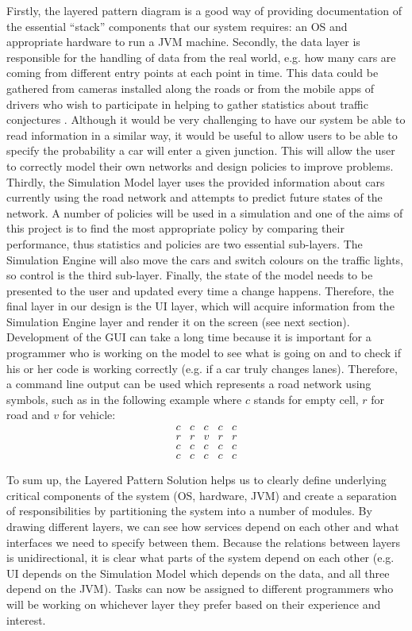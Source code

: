 \documentclass{article}
\begin{document}
	Firstly, the layered pattern diagram is a good way of providing documentation of the essential “stack” components that our system requires: an OS and appropriate hardware to run a JVM machine. 
	Secondly, the data layer is responsible for the handling of data from the real world, e.g. how many cars are coming from different entry points at each point in time. 
	This data could be gathered from cameras installed along the roads or from the mobile apps of drivers who wish to participate in helping to gather statistics about traffic conjectures \cite{NCTA}. 
	Although it would be very challenging to have our system be able to read information in a similar way, it would be useful to allow users to be able to specify the probability a car will enter a given junction. 
	This will allow the user to correctly model their own networks and design policies to improve problems. Thirdly, the Simulation Model layer uses the provided information about cars currently using the road network and attempts to predict future states of the network. 
	A number of policies will be used in a simulation and one of the aims of this project is to find the most appropriate policy by comparing their performance, thus statistics and policies are two essential sub-layers. 
	The Simulation Engine will also move the cars and switch colours on the traffic lights, so control is the third sub-layer. 
	Finally, the state of the model needs to be presented to the user and updated every time a change happens. 
	Therefore, the final layer in our design is the UI layer, which will acquire information from the Simulation Engine layer and render it on the screen (see next section). 
	Development of the GUI can take a long time because it is important for a programmer who is working on the model to see what is going on and to check if his or her code is working correctly (e.g. if a car truly changes lanes). 
	Therefore, a command line output can be used which represents a road network using symbols, such as in the following example where $c$ stands for empty cell, $r$ for road and $v$ for vehicle: \\
	
	$$
	\begin{matrix}
	c & c & c & c & c \\
	r & r & v & r & r \\
	c & c & c & c & c \\
	c & c & c & c & c
	\end{matrix}
	$$
	
	To sum up, the Layered Pattern Solution helps us to clearly define underlying critical components of the system (OS, hardware, JVM) and create a separation of responsibilities by partitioning the system into a number of modules. 
	By drawing different layers, we can see how services depend on each other and what interfaces we need to specify between them. 
	Because the relations between layers is unidirectional, it is clear what parts of the system depend on each other (e.g. UI depends on the Simulation Model which depends on the data, and all three depend on the JVM).
	Tasks can now be assigned to different programmers who will be working on whichever layer they prefer based on their experience and interest. 
	
\end{document}
